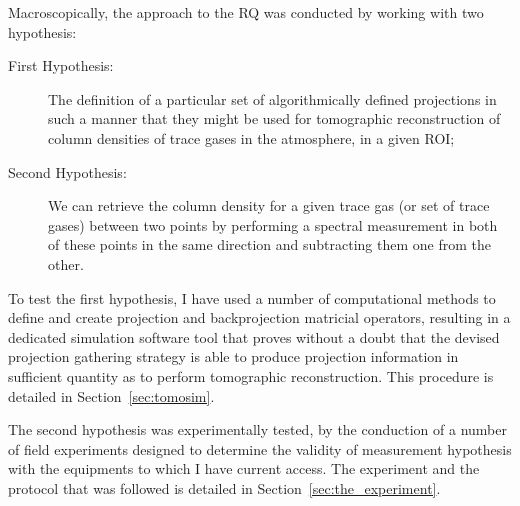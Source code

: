 

Macroscopically, the approach to the \gls{RQ} was conducted by working
with two hypothesis:
\begin{description}
    \item[First Hypothesis:] The definition of a particular set of
        algorithmically defined projections in such a manner that they
        might be used for tomographic reconstruction of column densities
        of trace gases in the atmosphere, in a given \gls{ROI};
    \item[Second Hypothesis:] We can retrieve the column density for a
        given trace gas (or set of trace gases) between two points by
        performing a spectral measurement in both of these points in the
        same direction and subtracting them one from the other.
\end{description}

To test the first hypothesis, I have used a number of computational
methods to define and create projection and backprojection matricial
operators, resulting in a dedicated simulation software tool that proves
without a doubt that the devised projection gathering strategy is able
to produce projection information in sufficient quantity as to perform
tomographic reconstruction. This procedure is detailed in
Section~\ref{sec:tomosim}. 

The second hypothesis was experimentally tested, by the conduction of a
number of field experiments designed to determine the validity of
measurement hypothesis with the equipments to which I have current
access. The experiment and the protocol that was followed is detailed in
Section~\ref{sec:the_experiment}.
